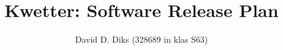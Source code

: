 \documentclass[]{scrreprt}
\title{Kwetter: Software Release Plan}
\author{David D. Diks (328689 in klas S63)}
\begin{document}
\maketitle

\begin{abstract}
	
\end{abstract}
\tableofcontents







\end{document}
